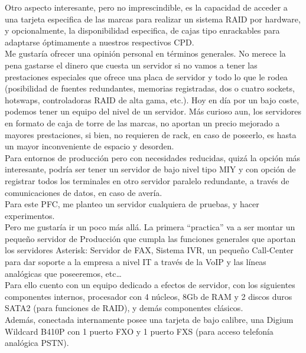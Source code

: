 Otro aspecto interesante, pero no imprescindible, es la capacidad de acceder a una tarjeta especifica de las marcas para realizar un sistema RAID por hardware, y opcionalmente, la disponibilidad especifica, de cajas tipo enrackables para adaptarse óptimamente a nuestros respectivos CPD.\\

Me gustaría ofrecer una opinión personal en términos generales. No merece la pena gastarse el dinero que cuesta un servidor si no vamos a tener las prestaciones especiales que ofrece una placa de servidor y todo lo que le rodea (posibilidad de fuentes redundantes, memorias registradas, dos o cuatro sockets, hotswaps, controladoras RAID de alta gama, etc.). Hoy en día por un bajo coste, podemos tener un equipo del nivel de un servidor. Más curioso aun, los servidores en formato de caja de torre de las marcas, no aportan un precio mejorado a mayores prestaciones, si bien, no requieren de rack, en caso de poseerlo, es hasta un mayor inconveniente de espacio y desorden.\\

Para entornos de producción pero con necesidades reducidas, quizá la opción más interesante, podría ser  tener un servidor de bajo nivel tipo MIY y con opción de registrar todos los terminales en otro servidor paralelo redundante, a través de comunicaciones de datos, en caso de avería.\\

Para este PFC, me planteo un servidor cualquiera de pruebas, y hacer experimentos.\\

Pero me gustaría ir un poco más allá. La primera “practica” va a ser montar un pequeño servidor de Producción que cumpla las funciones generales que aportan los servidores Asterisk: Servidor de FAX, Sistema IVR, un pequeño Call-Center para dar soporte a la empresa a nivel IT a través de la VoIP y las líneas analógicas que poseeremos, etc…\\

Para ello cuento con un equipo dedicado a efectos de servidor, con los siguientes componentes internos, procesador con 4 núcleos, 8Gb de RAM y 2 discos duros SATA2 (para funciones de RAID), y demás componentes clásicos.\\

Además, conectada internamente posee una tarjeta de bajo calibre, una Digium Wildcard B410P con 1 puerto FXO y 1 puerto FXS (para acceso telefonía analógica PSTN).\\

